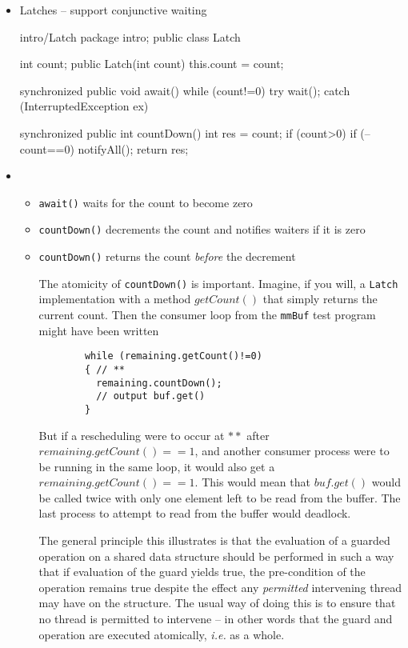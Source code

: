 \documentclass{concdistfoils}
\begin{document}
\begin{slide}

\begin{itemize}
\item Latches -- support conjunctive waiting
\vfill
\begin{class}{intro/Latch}
package intro;
public class Latch
{ int count;
  public Latch(int count)  { this.count = count; }
  
  synchronized public void await() 
  { while (count!=0) try { wait(); } catch (InterruptedException ex) {} }
      
  synchronized public int countDown()
  { int res = count;
    if (count>0) { if (--count==0) notifyAll(); }
    return res;
  }
}
\end{class}
\vfill
\item[]
\begin{itemize}
\item \texttt{await()} waits for the count to become zero
\item \texttt{countDown()} decrements the count and notifies waiters if it is zero
\item \texttt{countDown()} returns the count \textit{before} the decrement
\begin{note}
The atomicity of \texttt{countDown()} is important. Imagine, if you will,
a \texttt{Latch} implementation with a method $getCount()$ that simply returns the 
current count. Then the consumer loop from the \texttt{mmBuf} test program might have been written
\begin{verbatim}
        while (remaining.getCount()!=0) 
        { // **
          remaining.countDown();
          // output buf.get() 
        }
\end{verbatim}

But if a rescheduling were to occur at $**$ after
$remaining.getCount()==1$, and another consumer process were to be
running in the same loop, it would also get a $remaining.getCount()==1$.
This would mean that $buf.get()$ would be called twice with only
one element left to be read from the buffer. The last process
to attempt to read from the buffer would deadlock.

The general principle this illustrates is that the evaluation of a
guarded operation on a shared data structure should be performed
in such a way that if evaluation of the guard yields true, the
pre-condition of the operation remains true despite the effect any
\textit{permitted} intervening thread may have on the structure.
The usual way of doing this is to ensure that no thread is permitted
to intervene -- in other words that the guard and operation are
executed atomically, \textit{i.e.} as a whole.

\end{note}
\end{itemize}
\end{itemize}
\end{slide}
\end{document}
